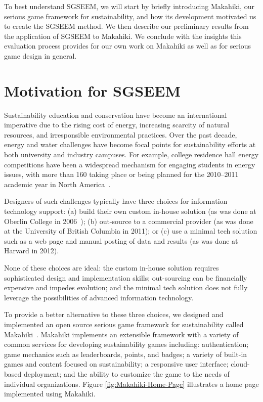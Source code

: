 \documentclass{sigchi}
\begin{document}
To best understand SGSEEM, we will start by briefly introducing Makahiki, our serious game
framework for sustainability, and how its development motivated us to create the SGSEEM method. We then describe our preliminary
results from the application of SGSEEM to Makahiki. We conclude with the insights this
evaluation process provides for our own work on Makahiki as well as for serious game
design in general.


\section{Motivation for SGSEEM}

Sustainability education and conservation have become an international
imperative due to the rising cost of energy, increasing scarcity of
natural resources, and irresponsible environmental practices. Over the
past decade, energy and water challenges have become focal
points for sustainability efforts at both university and industry
campuses. For example, college residence hall energy competitions have
been a widespread mechanism for engaging students in energy issues,
with more than 160 taking place or being planned for the 2010--2011
academic year in North America~\cite{Hodge2010}.

Designers of such challenges typically have three choices for
information technology support: (a) build their own custom in-house
solution (as was done at Oberlin College in
2006~\cite{petersen-dorm-energy-reduction}); (b) out-source to a
commercial provider (as was done at the University of British Columbia
in 2011); or (c) use a minimal tech solution such as a web page and
manual posting of data and results (as was done at Harvard in 2012).

None of these choices are ideal: the custom in-house solution requires
sophisticated design and implementation skills; out-sourcing can be
financially expensive and impedes evolution; and the minimal tech
solution does not fully leverage the possibilities of advanced
information technology.

To provide a better alternative to these three choices, we designed and implemented
an open source serious game framework for sustainability called
Makahiki~\cite{csdl2-12-06}.  Makahiki implements an extensible framework with a variety
of common services for developing sustainability games including: authentication; game
mechanics such as leaderboards, points, and badges; a variety of built-in games and
content focused on sustainability; a responsive user interface; cloud-based deployment;
and the ability to customize the game to the needs of individual organizations.  
Figure \ref{fig:Makahiki-Home-Page} illustrates a home page implemented using Makahiki.
\end{document}
